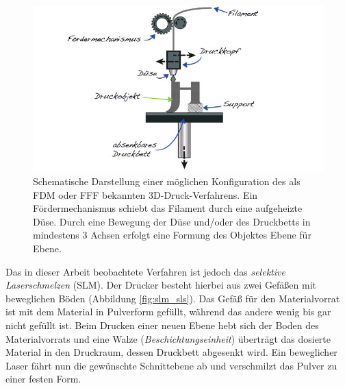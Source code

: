 		\begin{figure}[ht]
			\centering
			\includegraphics[width=\textwidth]{chapter/main/img/FDM.png}
			\caption[Schematische Darstellung des FDM-/FFF-Verfahrens]{Schematische Darstellung
			einer möglichen Konfiguration des als FDM oder FFF bekannten 3D-Druck-Verfahrens.
			Ein Fördermechanismus schiebt das Filament durch eine aufgeheizte Düse. Durch eine
			Bewegung der Düse und/oder des Druckbetts in mindestens 3 Achsen erfolgt eine Formung
			des Objektes Ebene für Ebene. \cite[S. 114]{horsch20143d}}
			\label{fig:fdm}
		\end{figure}

		Das in dieser Arbeit beobachtete Verfahren ist jedoch das \emph{selektive Laserschmelzen}
		(SLM). Der Drucker besteht hierbei aus zwei Gefäßen mit beweglichen Böden (Abbildung
		\ref{fig:slm_sls}). Das Gefäß für den Materialvorrat ist mit dem Material in Pulverform
		gefüllt, während das andere wenig bis gar nicht gefüllt ist. Beim Drucken einer neuen Ebene
		hebt sich der Boden des Materialvorrats und eine Walze (\emph{Beschichtungseinheit}) überträgt
		das dosierte Material in den Druckraum, dessen Druckbett abgesenkt wird. Ein beweglicher
		Laser fährt nun die gewünschte Schnittebene ab und verschmilzt das Pulver zu einer festen Form.

